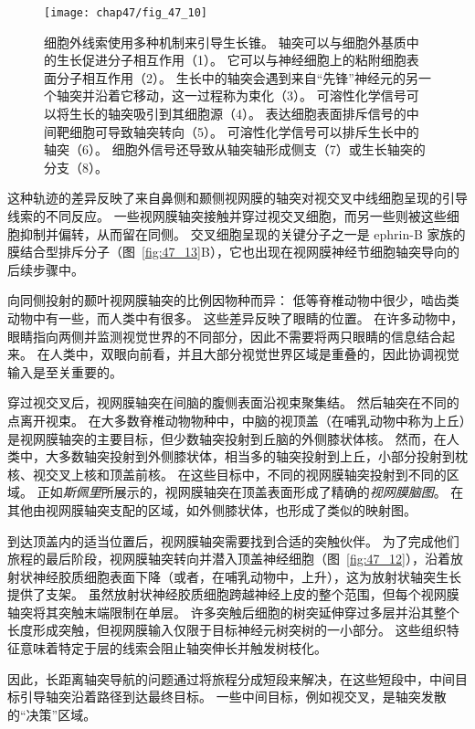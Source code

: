 \begin{figure}[htbp]
	\centering
	\texttt{[image: chap47/fig\_47\_10]}
	\caption{细胞外线索使用多种机制来引导生长锥。
		轴突可以与细胞外基质中的生长促进分子相互作用（1）。
		它可以与神经细胞上的粘附细胞表面分子相互作用（2）。
		生长中的轴突会遇到来自“先锋”神经元的另一个轴突并沿着它移动，这一过程称为束化（3）。
		可溶性化学信号可以将生长的轴突吸引到其细胞源（4）。
		表达细胞表面排斥信号的中间靶细胞可导致轴突转向（5）。
		可溶性化学信号可以排斥生长中的轴突（6）。
		细胞外信号还导致从轴突轴形成侧支（7）或生长轴突的分支（8）。}
	\label{fig:47_10}
\end{figure}


这种轨迹的差异反映了来自鼻侧和颞侧视网膜的轴突对视交叉中线细胞呈现的引导线索的不同反应。
一些视网膜轴突接触并穿过视交叉细胞，而另一些则被这些细胞抑制并偏转，从而留在同侧。
交叉细胞呈现的关键分子之一是 ephrin-B 家族的膜结合型排斥分子（图~\ref{fig:47_13}B），它也出现在视网膜神经节细胞轴突导向的后续步骤中。


向同侧投射的颞叶视网膜轴突的比例因物种而异：
低等脊椎动物中很少，啮齿类动物中有一些，而人类中有很多。
这些差异反映了眼睛的位置。
在许多动物中，眼睛指向两侧并监测视觉世界的不同部分，因此不需要将两只眼睛的信息结合起来。
在人类中，双眼向前看，并且大部分视觉世界区域是重叠的，因此协调视觉输入是至关重要的。


穿过视交叉后，视网膜轴突在间脑的腹侧表面沿视束聚集结。
然后轴突在不同的点离开视束。
在大多数脊椎动物物种中，中脑的视顶盖（在哺乳动物中称为上丘）是视网膜轴突的主要目标，但少数轴突投射到丘脑的外侧膝状体核。
然而，在人类中，大多数轴突投射到外侧膝状体，相当多的轴突投射到上丘，小部分投射到枕核、视交叉上核和顶盖前核。
在这些目标中，不同的视网膜轴突投射到不同的区域。
正如\textit{斯佩里}所展示的，视网膜轴突在顶盖表面形成了精确的\textit{视网膜脑图}。
在其他由视网膜轴突支配的区域，如外侧膝状体，也形成了类似的映射图。


到达顶盖内的适当位置后，视网膜轴突需要找到合适的突触伙伴。
为了完成他们旅程的最后阶段，视网膜轴突转向并潜入顶盖神经细胞（图~\ref{fig:47_12}），沿着放射状神经胶质细胞表面下降（或者，在哺乳动物中，上升），这为放射状轴突生长提供了支架。
虽然放射状神经胶质细胞跨越神经上皮的整个范围，但每个视网膜轴突将其突触末端限制在单层。
许多突触后细胞的树突延伸穿过多层并沿其整个长度形成突触，但视网膜输入仅限于目标神经元树突树的一小部分。
这些组织特征意味着特定于层的线索会阻止轴突伸长并触发树枝化。


因此，长距离轴突导航的问题通过将旅程分成短段来解决，在这些短段中，中间目标引导轴突沿着路径到达最终目标。
一些中间目标，例如视交叉，是轴突发散的“决策”区域。


